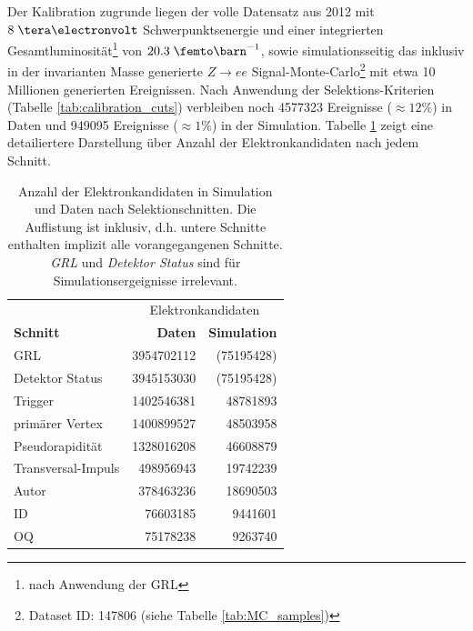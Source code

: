 Der Kalibration zugrunde liegen der volle Datensatz aus 2012 mit $8\TeV$
Schwer\-punktsenergie und einer integrierten Gesamtluminosität\footnote{nach
Anwendung der \ac{GRL}} von $20.3\fb^{-1}$, sowie simulationsseitig das
inklusiv in der invarianten Masse generierte $Z\rightarrow ee$
Signal-Monte-Carlo\footnote{Dataset ID: 147806 (siehe Tabelle
\ref{tab:MC_samples})} mit etwa 10 Millionen generierten Ereignissen. Nach
Anwendung der Selektions-Kriterien (Tabelle \ref{tab:calibration_cuts})
verbleiben noch 4577323 Ereignisse ($\approx 12\%$) in Daten und 949095
Ereignisse ($\approx 1\%$) in der Simulation. Tabelle
\ref{tab:remaining_electrons} zeigt eine detailiertere Darstellung über Anzahl
der Elektronkandidaten nach jedem Schnitt.

\begin{table}[h]
    \centering
    \begin{tabular}{|l|r|r|}
        \hline
        & \multicolumn{2}{|c|}{Elektronkandidaten} \\
        \textbf{Schnitt} & \textbf{Daten} & \textbf{Simulation} \\
        \hline\hline
        \ac{GRL}           & 3954702112 & (75195428) \\
        Detektor Status    & 3945153030 & (75195428) \\
        Trigger            & 1402546381 & 48781893 \\
        primärer Vertex    & 1400899527 & 48503958 \\
        Pseudorapidität    & 1328016208 & 46608879 \\
        Transversal-Impuls &  498956943 & 19742239 \\
        Autor              &  378463236 & 18690503 \\
        ID                 &   76603185 &  9441601 \\
        OQ                 &   75178238 &  9263740 \\
        \hline
    \end{tabular}
    \caption[Anzahl der Elektronkandidaten in Simulation und Daten nach
        Selektionschnitten]
        {Anzahl der Elektronkandidaten in Simulation und Daten nach
        Selektionschnitten. Die Auflistung ist inklusiv, d.h. untere Schnitte
        enthalten implizit alle vorangegangenen Schnitte. \textit{\ac{GRL}} und
    \textit{Detektor Status} sind für Simulationsergeignisse irrelevant.}
    \label{tab:remaining_electrons}
\end{table}

